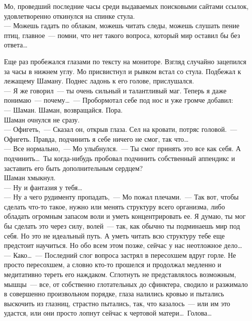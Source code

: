 \newpage 

Мо, проведший последние часы среди выдаваемых поисковыми сайтами ссылок, 
удовлетворенно откинулся на спинке стула.\\
--- Можешь гадать по облакам, можешь читать следы, можешь слушать пение птиц, 
главное~--- помни, что нет такого вопроса, который мир оставил бы без 
ответа\ldots

Еще раз пробежался глазами по тексту на мониторе. Взгляд случайно зацепился за 
часы в нижнем углу. Мо присвистнул и рывком встал со стула. Подбежал к лежащему 
Шаману. Поднес ладонь к его голове, прислушался.\\
--- Я же говорил~--- ты очень сильный и талантливый маг. Теперь я даже 
понимаю~--- почему\ldots~--- Пробормотал себе под нос и уже громче добавил:\\
--- Шаман. Шаман, возвращайся. Пора.\\
Шаман очнулся не сразу.\\
--- Офигеть,~--- Сказал он, открыв глаза. Сел на кровати, потряс головой.~--- 
Офигеть. Правда, подчинить я себе ничего не смог, так что\ldots\\
--- Все нормально,~--- Мо улыбнулся.~--- Ты смог принять это все как себя. А 
подчинить\ldots\ Ты когда-нибудь пробовал подчинить собственный аппендикс и 
заставить его быть дополнительным сердцем?\\
Шаман хмыкнул.\\
--- Ну и фантазия у тебя\ldots\\
--- Ну а чего рудименту пропадать,~--- Мо пожал плечами.~--- Так вот, чтобы 
сделать что-то такое, нужно или менять структуру всего организма, либо обладать 
огромным запасом воли и уметь концентрировать ее. Я думаю, ты мог бы сделать это через 
силу, волей~--- так, как обычно ты подминаешь мир под себя. Но это не идеальный 
путь. А уметь читать всю структуру тебе еще предстоит научиться. Но обо всем 
этом позже, сейчас у нас неотложное дело\ldots\\
--- Како\ldots~--- Последний слог вопроса застрял в пересохшем вдруг горле. Не 
просто пересохшем, а словно кто-то прошелся и продолжал медленно и медитативно тереть 
его наждаком. Сглотнуть не представлялось возможным, мышцы~--- все, от 
собственно глотательных до сфинктера, сводило и разжимало в совершенно произвольном 
порядке, глаза налились кровью и пытались выскочить из глазниц, страстно 
пытались, так, что казалось~--- или им это удастся, или они просто лопнут 
сейчас к чертовой матери\ldots\ Голова\ldots\\
